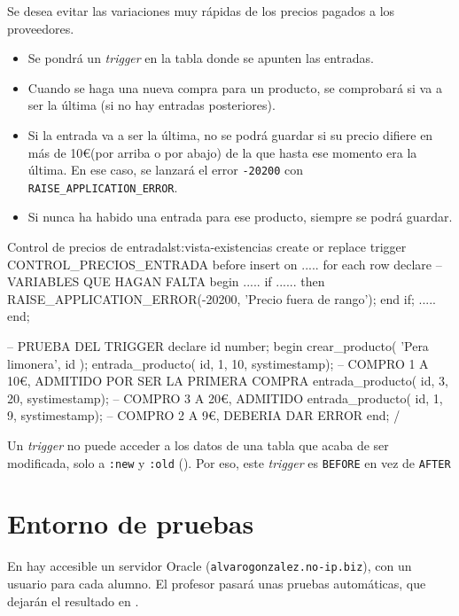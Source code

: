 \begin{homeworkProblem}

  Se desea evitar las variaciones muy rápidas de los precios pagados a los proveedores.
  \begin{itemize}
  \item Se pondrá un \textit{trigger} en la tabla donde se apunten las entradas.
  \item Cuando se haga una nueva compra para un producto, se comprobará si va a ser la última (si no hay entradas posteriores).
  \item Si la entrada va a ser la última, no se podrá guardar si su precio difiere en más de 10\euro (por arriba o por abajo) de la que hasta ese momento era la última. En ese caso, se lanzará el error \texttt{-20200} con \texttt{RAISE\_APPLICATION\_ERROR}.
  \item Si nunca ha habido una entrada para ese producto, siempre se podrá guardar.
\end{itemize}

  \begin{listadosql}{Control de precios de entrada}{lst:vista-existencias}
create or replace trigger CONTROL_PRECIOS_ENTRADA
before insert on .....
for each row 
declare
  -- VARIABLES QUE HAGAN FALTA
begin
  .....
  if ...... then
    RAISE_APPLICATION_ERROR(-20200, 'Precio fuera de rango');
  end if;
  .....
end;

-- PRUEBA DEL TRIGGER
declare
  id number;
begin
  crear_producto( 'Pera limonera', id );
  entrada_producto( id, 1, 10, systimestamp); -- COMPRO 1 A 10€, ADMITIDO POR SER LA PRIMERA COMPRA
  entrada_producto( id, 3, 20, systimestamp); -- COMPRO 3 A 20€, ADMITIDO
  entrada_producto( id, 1, 9, systimestamp); -- COMPRO 2 A 9€, DEBERIA DAR ERROR
end;
/

  \end{listadosql}  

\begin{Aviso}
Un \textit{trigger} no puede acceder a los datos de una tabla que acaba de ser modificada, solo a \texttt{:new} y \texttt{:old} (). Por eso, este \textit{trigger} es \texttt{BEFORE} en vez de \texttt{AFTER}
\end{Aviso}


\end{homeworkProblem}


\section{Entorno de pruebas}
En hay accesible un servidor Oracle (\texttt{alvarogonzalez.no-ip.biz}), con un usuario para cada alumno.
El profesor pasará unas pruebas automáticas, que dejarán el resultado en .

